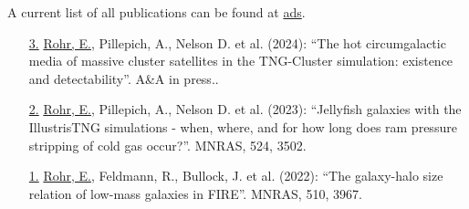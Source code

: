 \documentclass[a4paper,10pt,oneside]{article}
\begin{document}
\noindent{}

\vspace{5.5pt}

\noindent A current list of all publications can be found at \href{https://ui.adsabs.harvard.edu/search/q=%20%20author%3A%22rohr%2C%20eric%22%2C%20year%3A2019-2030&sort=date%20desc%2C%20bibcode%20desc&p_=0}{ads}. 

\vspace{5.5pt} 

\begin{enumerate}[wide, labelwidth=!, labelindent=-11pt, parsep=0pt]
    \item[\href{https://www.aanda.org/component/article?access=doi&doi=10.1051/0004-6361/202348583}{3.}] \underline{Rohr, E.}, Pillepich, A., Nelson D. et al. (2024): ``The hot circumgalactic media of massive cluster satellites in the TNG-Cluster simulation: existence and detectability''. A\&A in press..
    \item[\href{https://ui.adsabs.harvard.edu/abs/2023MNRAS.524.3502R/abstract}{2.}] \underline{Rohr, E.}, Pillepich, A., Nelson D. et al. (2023): ``Jellyfish galaxies with the IllustrisTNG simulations - when, where, and for how long does ram pressure stripping of cold gas occur?''. MNRAS, 524, 3502.
    \item[\href{https://ui.adsabs.harvard.edu/abs/2022MNRAS.510.3967R/abstract}{1.}] \underline{Rohr, E.}, Feldmann, R., Bullock, J. et al. (2022): ``The galaxy-halo size relation of low-mass galaxies in FIRE''. MNRAS, 510, 3967.
\end{enumerate}
\end{document}
